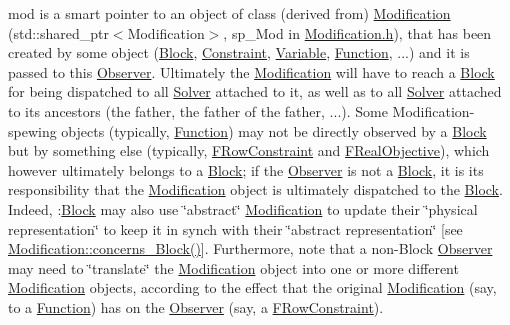 mod is a smart pointer to an object of class (derived from) \mbox{\hyperlink{class_s_m_spp__di__unipi__it_1_1_modification}{Modification}} (std\+::shared\+\_\+ptr$<$\+Modification$>$, sp\+\_\+\+Mod in \mbox{\hyperlink{_modification_8h}{Modification.\+h}}), that has been created by some object (\mbox{\hyperlink{class_s_m_spp__di__unipi__it_1_1_block}{Block}}, \mbox{\hyperlink{class_s_m_spp__di__unipi__it_1_1_constraint}{Constraint}}, \mbox{\hyperlink{class_s_m_spp__di__unipi__it_1_1_variable}{Variable}}, \mbox{\hyperlink{class_s_m_spp__di__unipi__it_1_1_function}{Function}}, ...) and it is passed to this \mbox{\hyperlink{class_s_m_spp__di__unipi__it_1_1_observer}{Observer}}. Ultimately the \mbox{\hyperlink{class_s_m_spp__di__unipi__it_1_1_modification}{Modification}} will have to reach a \mbox{\hyperlink{class_s_m_spp__di__unipi__it_1_1_block}{Block}} for being dispatched to all \mbox{\hyperlink{class_s_m_spp__di__unipi__it_1_1_solver}{Solver}} attached to it, as well as to all \mbox{\hyperlink{class_s_m_spp__di__unipi__it_1_1_solver}{Solver}} attached to its ancestors (the father, the father of the father, ...). Some Modification-\/spewing objects (typically, \mbox{\hyperlink{class_s_m_spp__di__unipi__it_1_1_function}{Function}}) may not be directly observed by a \mbox{\hyperlink{class_s_m_spp__di__unipi__it_1_1_block}{Block}} but by something else (typically, \mbox{\hyperlink{class_s_m_spp__di__unipi__it_1_1_f_row_constraint}{F\+Row\+Constraint}} and \mbox{\hyperlink{class_s_m_spp__di__unipi__it_1_1_f_real_objective}{F\+Real\+Objective}}), which however ultimately belongs to a \mbox{\hyperlink{class_s_m_spp__di__unipi__it_1_1_block}{Block}}; if the \mbox{\hyperlink{class_s_m_spp__di__unipi__it_1_1_observer}{Observer}} is not a \mbox{\hyperlink{class_s_m_spp__di__unipi__it_1_1_block}{Block}}, it is its responsibility that the \mbox{\hyperlink{class_s_m_spp__di__unipi__it_1_1_modification}{Modification}} object is ultimately dispatched to the \mbox{\hyperlink{class_s_m_spp__di__unipi__it_1_1_block}{Block}}. Indeed, \+:\mbox{\hyperlink{class_s_m_spp__di__unipi__it_1_1_block}{Block}} may also use \char`\"{}abstract\char`\"{} \mbox{\hyperlink{class_s_m_spp__di__unipi__it_1_1_modification}{Modification}} to update their \char`\"{}physical
representation\char`\"{} to keep it in synch with their \char`\"{}abstract representation\char`\"{} \mbox{[}see \mbox{\hyperlink{class_s_m_spp__di__unipi__it_1_1_modification_a22fe0cccfc755cfd89b240587d1f1cad}{Modification\+::concerns\+\_\+\+Block()}}\mbox{]}. Furthermore, note that a non-\/\+Block \mbox{\hyperlink{class_s_m_spp__di__unipi__it_1_1_observer}{Observer}} may need to \char`\"{}translate\char`\"{} the \mbox{\hyperlink{class_s_m_spp__di__unipi__it_1_1_modification}{Modification}} object into one or more different \mbox{\hyperlink{class_s_m_spp__di__unipi__it_1_1_modification}{Modification}} objects, according to the effect that the original \mbox{\hyperlink{class_s_m_spp__di__unipi__it_1_1_modification}{Modification}} (say, to a \mbox{\hyperlink{class_s_m_spp__di__unipi__it_1_1_function}{Function}}) has on the \mbox{\hyperlink{class_s_m_spp__di__unipi__it_1_1_observer}{Observer}} (say, a \mbox{\hyperlink{class_s_m_spp__di__unipi__it_1_1_f_row_constraint}{F\+Row\+Constraint}}).

